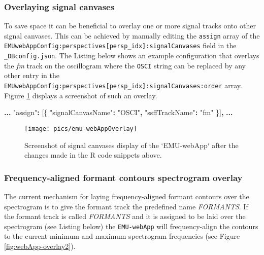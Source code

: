\documentclass[
]{book}
\newenvironment{Shaded}{\begin{snugshade}}{\end{snugshade}}
\newcommand{\NormalTok}[1]{#1}
\newcommand{\OperatorTok}[1]{\textcolor[rgb]{0.81,0.36,0.00}{\textbf{#1}}}
\newcommand{\StringTok}[1]{\textcolor[rgb]{0.31,0.60,0.02}{#1}}
\begin{document}
\hypertarget{overlaying-signal-canvases}{%
\subsubsection*{Overlaying signal canvases}\label{overlaying-signal-canvases}}

To save space it can be beneficial to overlay one or more signal tracks onto other signal canvases. This can be achieved by manually editing the \texttt{assign} array of the \texttt{EMUwebAppConfig:perspectives{[}persp\_idx{]}:signalCanvases} field in the \texttt{\_DBconfig.json}. The Listing below shows an example configuration that overlays the \emph{fm} track on the oscillogram where the \texttt{OSCI} string can be replaced by any other entry in the \texttt{EMUwebAppConfig:perspectives{[}persp\_idx{]}:signalCanvases:order} array. Figure \ref{fig:webApp-overlay1} displays a screenshot of such an overlay.

\begin{Shaded}
\begin{Highlighting}[]
\OperatorTok{...}
\StringTok{"assign"}\OperatorTok{:}\NormalTok{ [\{}
    \StringTok{"signalCanvasName"}\OperatorTok{:} \StringTok{"OSCI"}\OperatorTok{,}
    \StringTok{"ssffTrackName"}\OperatorTok{:} \StringTok{"fm"}
\NormalTok{\}]}\OperatorTok{,}
\OperatorTok{...}
\end{Highlighting}
\end{Shaded}

\begin{figure}

{\centering \texttt{[image: pics/emu-webAppOverlay]} 

}

\caption{Screenshot of signal canvases display of the `EMU-webApp` after the changes made in the R code snippets above.}\label{fig:webApp-overlay1}
\end{figure}

\hypertarget{frequency-aligned-formant-contours-spectrogram-overlay}{%
\subsubsection*{Frequency-aligned formant contours spectrogram overlay}\label{frequency-aligned-formant-contours-spectrogram-overlay}}

The current mechanism for laying frequency-aligned formant contours over the spectrogram is to give the formant track the predefined name \emph{FORMANTS}. If the formant track is called \emph{FORMANTS} and it is assigned to be laid over the spectrogram (see Listing below) the \texttt{EMU-webApp} will frequency-align the contours to the current minimum and maximum spectrogram frequencies (see Figure \ref{fig:webApp-overlay2}).
\end{document}
